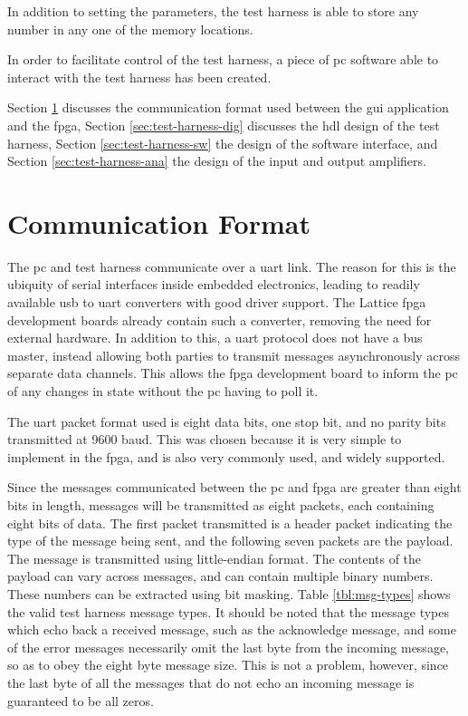 In addition to setting the parameters, the test harness is able to store any number in any one of the memory locations.

In order to facilitate control of the test harness, a piece of \gls{pc} software able to interact with the test harness has been created.

Section \ref{sec:test-harness-comms} discusses the communication format used between the \gls{gui} application and the \gls{fpga}, Section \ref{sec:test-harness-dig} discusses the \gls{hdl} design of the test harness, Section \ref{sec:test-harness-sw} the design of the software interface, and Section \ref{sec:test-harness-ana} the design of the input and output amplifiers.

\section{Communication Format} \label{sec:test-harness-comms}
The \gls{pc} and test harness communicate over a \gls{uart} link. The reason for this is the ubiquity of serial interfaces inside embedded electronics, leading to readily available \gls{usb} to \gls{uart} converters with good driver support. The Lattice \gls{fpga} development boards already contain such a converter, removing the need for external hardware. In addition to this, a \gls{uart} protocol does not have a bus master, instead allowing both parties to transmit messages asynchronously across separate data channels. This allows the \gls{fpga} development board to inform the \gls{pc} of any changes in state without the \gls{pc} having to poll it.

The \gls{uart} packet format used is eight data bits, one stop bit, and no parity bits transmitted at 9600 baud. This was chosen because it is very simple to implement in the \gls{fpga}, and is also very commonly used, and widely supported.

Since the messages communicated between the \gls{pc} and \gls{fpga} are greater than eight bits in length, messages will be transmitted as eight packets, each containing eight bits of data. The first packet transmitted is a header packet indicating the type of the message being sent, and the following seven packets are the payload. The message is transmitted using little-endian format. The contents of the payload can vary across messages, and can contain multiple binary numbers. These numbers can be extracted using bit masking. Table \ref{tbl:msg-types} shows the valid test harness message types. It should be noted that the message types which echo back a received message, such as the acknowledge message, and some of the error messages necessarily omit the last byte from the incoming message, so as to obey the eight byte message size. This is not a problem, however, since the last byte of all the messages that do not echo an incoming message is guaranteed to be all zeros.


